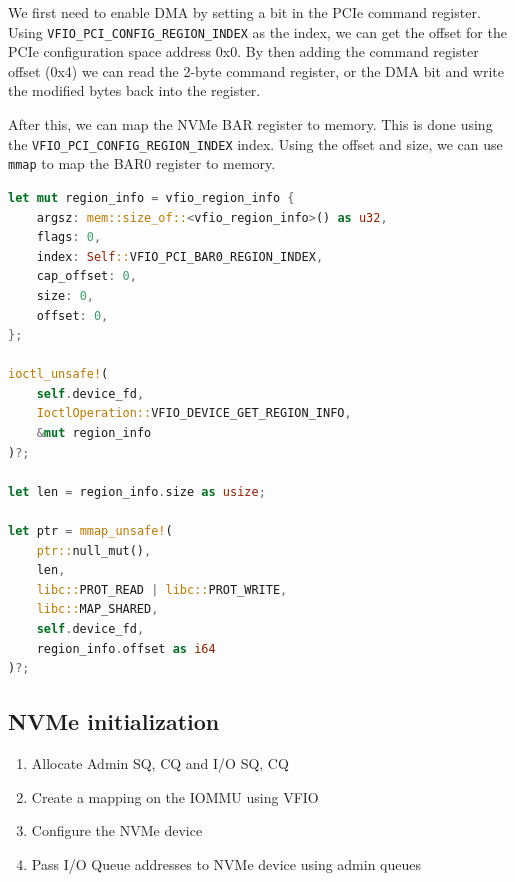 We first need to enable DMA by setting a bit in the PCIe command register.
Using \texttt{VFIO\_PCI\_CONFIG\_REGION\_INDEX} as the index, we can get the offset for the PCIe configuration space address 0x0. By then adding the command register offset (0x4) we can read the 2-byte command register, or the DMA bit and write the modified bytes back into the register.

After this, we can map the NVMe BAR register to memory. This is done using the \texttt{VFIO\_PCI\_CONFIG\_REGION\_INDEX} index. Using the offset and size, we can use \texttt{mmap} to map the BAR0 register to memory.

\begin{minipage}{.95\linewidth}
    \begin{lstlisting}[language=Rust,caption={Mapping the BAR0 NVMe register to memory}, label=lst:bar0map]
let mut region_info = vfio_region_info {
    argsz: mem::size_of::<vfio_region_info>() as u32,
    flags: 0,
    index: Self::VFIO_PCI_BAR0_REGION_INDEX,
    cap_offset: 0,
    size: 0,
    offset: 0,
};

ioctl_unsafe!(
    self.device_fd,
    IoctlOperation::VFIO_DEVICE_GET_REGION_INFO,
    &mut region_info
)?;

let len = region_info.size as usize;

let ptr = mmap_unsafe!(
    ptr::null_mut(),
    len,
    libc::PROT_READ | libc::PROT_WRITE,
    libc::MAP_SHARED,
    self.device_fd,
    region_info.offset as i64
)?; 
\end{lstlisting}
\end{minipage}

\subsection{NVMe initialization}\label{sec:nvmeinit}


\begin{enumerate}
    \item Allocate Admin SQ, CQ and I/O SQ, CQ
    \item Create a mapping on the IOMMU using VFIO
    \item Configure the NVMe device
    \item Pass I/O Queue addresses to NVMe device using admin queues
\end{enumerate}

